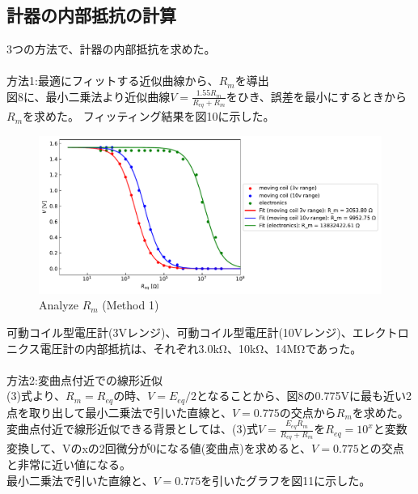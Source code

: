 \documentclass[a4paper,10pt]{jsarticle}
\begin{document}
\subsection{計器の内部抵抗の計算}
3つの方法で、計器の内部抵抗を求めた。\\\\
方法1:最適にフィットする近似曲線から、$R_m$を導出\\
図8に、最小二乗法より近似曲線$V = \frac{1.55R_m}{R_{eq} + R_m}$をひき、誤差を最小にするときから$R_m$を求めた。
フィッティング結果を図10に示した。
\begin{figure}[H]
  \centering
  \includegraphics[width=0.9\linewidth]{figs/req-V_fit.pdf}
  \caption{Analyze $R_m$ (Method 1)}
  \label{fig:my_label}
\end{figure}
可動コイル型電圧計(3Vレンジ)、可動コイル型電圧計(10Vレンジ)、エレクトロニクス電圧計の内部抵抗は、それぞれ3.0kΩ、10kΩ、14MΩであった。\\\\
方法2:変曲点付近での線形近似\\
(3)式より、$R_m=R_{eq}$の時、$V=E_{eq}/2$となることから、図8の0.775Vに最も近い2点を取り出して最小二乗法で引いた直線と、$V=0.775$の交点から$R_m$を求めた。\\
変曲点付近で線形近似できる背景としては、(3)式$V = \frac{E_{eq}R_m}{R_{eq}+R_m}$を$R_{eq}=10^x$と変数変換して、Vのxの2回微分が0になる値(変曲点)を求めると、$V=0.775$との交点と非常に近い値になる。\\
最小二乗法で引いた直線と、$V=0.775$を引いたグラフを図11に示した。
\end{document}

